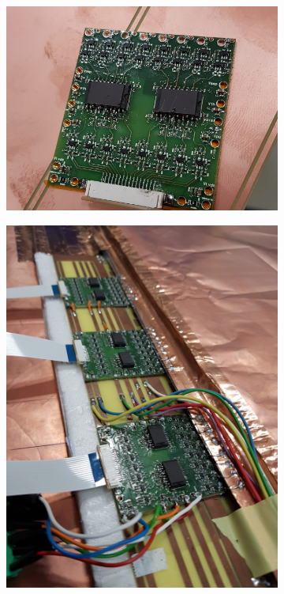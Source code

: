 	\begin{figure}[H]
		\begin{subfigure}{.5\linewidth}
		    \centering
			\includegraphics[width = \linewidth]{fig/chapt6/INFN-FEB.png}
			\caption{\label{fig:INFN_FEBv2:A}}
		\end{subfigure}
		\begin{subfigure}{.5\linewidth}
		    \centering
			\includegraphics[width = \linewidth]{fig/chapt6/INFN-FEB-on-readout.png}

\end{subfigure}
\end{figure}
